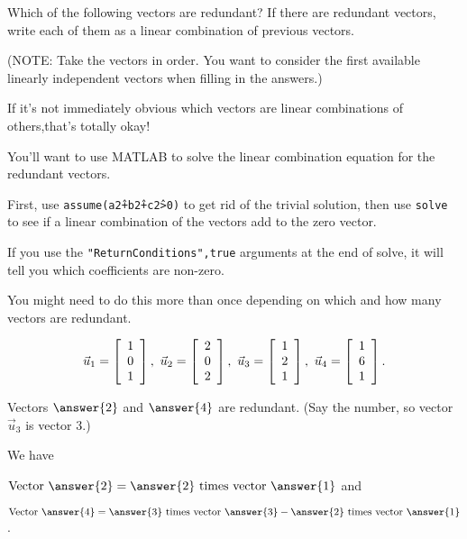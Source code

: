 \documentclass{ximera}
\author{Zack Reed}
\begin{document}
\begin{exercise}

    Which of the following vectors are redundant? If there are redundant
vectors, write each of them as a linear combination of previous
vectors.

(NOTE: Take the vectors in order. You want to consider the first available linearly independent vectors when filling in the answers.)

\begin{hint}

    If it's not immediately obvious which vectors are linear combinations of others,that's totally okay! 
    
    You'll want to use MATLAB to solve the linear combination equation for the redundant vectors.

    First, use \texttt{assume(a\^2+b\^2+c\^2>0)} to get rid of the trivial solution, then use \texttt{solve} to see if a linear combination of the vectors add to the zero vector.

    If you use the \texttt{"ReturnConditions",true} arguments at the end of solve, it will tell you which coefficients are non-zero. 

    You might need to do this more than once depending on which and how many vectors are redundant.

\end{hint}
\begin{equation*}
  \vect{u}_1 = \startmat{r} 1 \\ 0 \\ 1 \stopmat,\quad
  \vect{u}_2 = \startmat{r} 2 \\ 0 \\ 2 \stopmat,\quad
  \vect{u}_3 = \startmat{r} 1 \\ 2 \\ 1 \stopmat,\quad
  \vect{u}_4 = \startmat{r} 1 \\ 6 \\ 1 \stopmat.
\end{equation*}

  Vectors $\answer{2}$ and $\answer{4}$ are redundant. (Say the number, so vector $\vec{u}_3$ is vector $3$.)
  
  We have


  $\text{Vector }\answer{2}=\answer{2}\text{ times vector }\answer{1}$ and 
  
  $\text{Vector }\answer{4}=\answer{3}\text{ times vector }\answer{3}-\answer{2}\text{ times vector }\answer{1}$.


\end{exercise}
\end{document}
